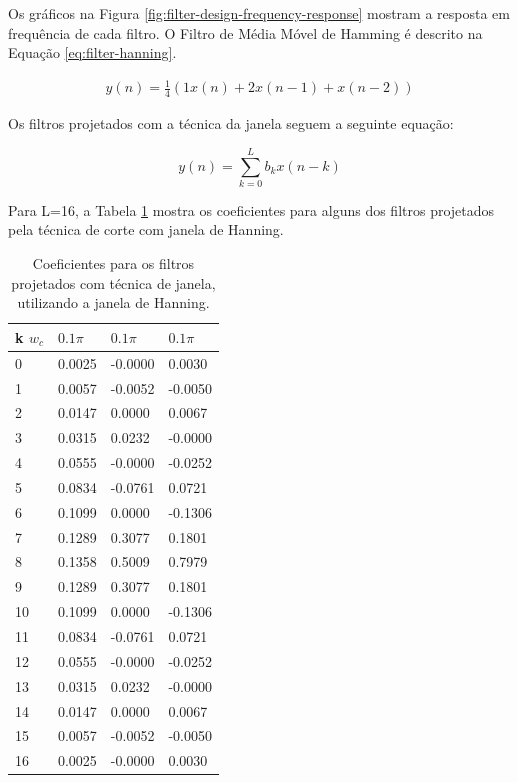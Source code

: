 Os gráficos na Figura \ref{fig:filter-design-frequency-response} mostram a resposta em frequência de cada filtro. O Filtro de Média Móvel de Hamming é descrito na Equação \ref{eq:filter-hanning}.

\begin{align}
\label{eq:filter-hanning}
y(n) = \frac{1}{4}(1 x(n) + 2 x(n-1) + x(n-2))
\end{align}

Os filtros projetados com a técnica da janela seguem a seguinte equação:

\begin{equation}
	y(n) = \sum_{k=0}^L b_k x(n-k)
\end{equation}

Para L=16, a Tabela \ref{tab:fir-filters-coefs} mostra os coeficientes para alguns dos filtros projetados pela técnica de corte com janela de Hanning.

\begin{table}
\centering
\begin{tabular}{|l|l|l|l|}\hline
k \/$w_c$ & $0.1\pi$ & $0.1\pi$ & $0.1\pi$ \\ \hline
  0	& 0.0025	&   -0.0000	&		0.0030 \\		
 1	& 0.0057	&   -0.0052	&	   -0.0050 \\	
 2	& 0.0147	&    0.0000	&	    0.0067 \\	
 3	& 0.0315	&    0.0232	&	   -0.0000 \\	
 4	& 0.0555	&   -0.0000	&	   -0.0252 \\	
 5	& 0.0834	&   -0.0761	&	    0.0721 \\	
 6	& 0.1099	&    0.0000	&	   -0.1306 \\	
 7	& 0.1289	&    0.3077	&	    0.1801 \\	
 8	& 0.1358	&    0.5009	&	    0.7979 \\	
 9	& 0.1289	&    0.3077	&	    0.1801 \\	
10	& 0.1099	&    0.0000	&	   -0.1306 \\	
11	& 0.0834	&   -0.0761	&	    0.0721 \\	
12	& 0.0555	&   -0.0000	&	   -0.0252 \\	
13	& 0.0315	&    0.0232	&	   -0.0000 \\	
14	& 0.0147	&    0.0000	&	    0.0067 \\	
15	& 0.0057	&   -0.0052	&	   -0.0050 \\	
16	& 0.0025	&   -0.0000	&	    0.0030 \\
\hline
\end{tabular}
\caption{Coeficientes para os filtros projetados com técnica de janela, utilizando a janela de Hanning.}
\label{tab:fir-filters-coefs}
\end{table}


